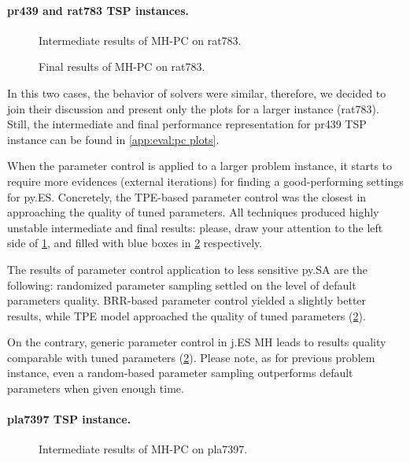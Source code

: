 \paragraph{pr439 and rat783 TSP instances.}
\begin{figure}[t]
	\centering
	\vspace{-20pt}
	
	\caption{Intermediate results of MH-PC on rat783.}
	\vspace{-5pt}
	\label{eval:pict:pc:rat783 intermediate}
\end{figure}
\begin{figure}[b]
	\centering
	\vspace{-20pt}
	
	\caption{Final results of MH-PC on rat783.}
	\vspace{-5pt}
	\label{eval:pict:pc:rat783 final}
\end{figure}

In this two cases, the behavior of solvers were similar, therefore, we decided to join their discussion and present only the plots for a larger instance (rat783). Still, the intermediate and final performance representation for pr439 TSP instance can be found in \cref{app:eval:pc plots}.

When the parameter control is applied to a larger problem instance, it starts to require more evidences (external iterations) for finding a good-performing settings for py.ES. Concretely, the TPE-based parameter control was the closest in approaching the quality of tuned parameters. All techniques produced highly unstable intermediate and final results: please, draw your attention to the left side of \cref{eval:pict:pc:rat783 intermediate}, and filled with blue boxes in \cref{eval:pict:pc:rat783 final} respectively.

The results of parameter control application to less sensitive py.SA are the following: randomized parameter sampling settled on the level of default parameters quality. BRR-based parameter control yielded a slightly better results, while TPE model approached the quality of tuned parameters (\cref{eval:pict:pc:rat783 final}).

On the contrary, generic parameter control in j.ES MH leads to results quality comparable  with tuned parameters (\cref{eval:pict:pc:rat783 final}). Please note, as for previous problem instance, even a random-based parameter sampling outperforms default parameters when given enough time.

\paragraph{pla7397 TSP instance.}
\begin{figure}[t]
	\centering
	\vspace{-20pt}
	
	\caption{Intermediate results of MH-PC on pla7397.}
	\vspace{-5pt}
	\label{eval:pict:pc:pla7397 intermediate}
\end{figure}

